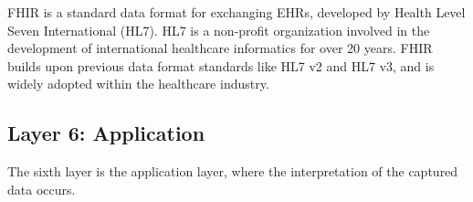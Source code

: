 \acf{FHIR} is a standard data format for exchanging \acs{EHR}s, developed by Health Level Seven International (HL7). HL7 is a non-profit organization involved in the development of international healthcare informatics for over 20 years. \acs{FHIR} builds upon previous data format standards like HL7 v2 and HL7 v3, and is widely adopted within the healthcare industry. 

\subsection{Layer 6: Application}
\label{sec:iot-model-layer6}



The sixth layer is the application layer, where the interpretation of the captured data occurs. 




